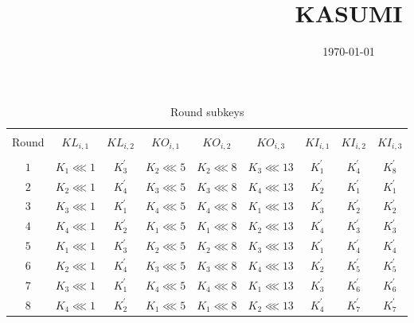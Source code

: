 \documentclass[12pt,a4paper]{article}
\title{KASUMI \vspace{-2em}}
\date{\today}
\begin{document}
  \maketitle
 \begin{table}[h!]
 	\centering
 	\begin{tabular}{|c c c c c c c c c|} 
 		\hline \\
 		Round & $KL_{i,1}$ & $KL_{i,2}$ & $KO_{i,1}$ & $KO_{i,2}$ & $KO_{i,3}$ & $KI_{i,1}$ & $KI_{i,2}$ & $KI_{i,3}$\\
 		\hline \\
 		$1$ & $K_1\lll 1$ & $K^{'}_3$ & $K_2 \lll 5$ & $K_2 \lll 8$& $K_3 \lll 13$& $K^{'}_1$& $K^{'}_4$ & $K^{'}_8$\\  [0.8ex]
 		
 		$2$ & $K_2\lll 1$ & $K^{'}_4$ & $K_3 \lll 5$ & $K_3 \lll 8$& $K_4 \lll 13$& $K^{'}_2$& $K^{'}_1$ & $K^{'}_1$\\  [0.8ex]
 		
 		$3$ & $K_3\lll 1$ & $K^{'}_1$ & $K_4 \lll 5$ & $K_4 \lll 8$& $K_1 \lll 13$& $K^{'}_3$& $K^{'}_2$ & $K^{'}_2$\\  [0.8ex]
 		
 		$4$ & $K_4\lll 1$ & $K^{'}_2$ & $K_1 \lll 5$ & $K_1 \lll 8$& $K_2 \lll 13$& $K^{'}_4$& $K^{'}_3$ & $K^{'}_3$\\  [0.8ex]
 		
 		$5$ & $K_1\lll 1$ & $K^{'}_3$ & $K_2 \lll 5$ & $K_2 \lll 8$& $K_3 \lll 13$& $K^{'}_1$& $K^{'}_4$ & $K^{'}_4$\\  [0.8ex]
 		
 		$6$ & $K_2\lll 1$ & $K^{'}_4$ & $K_3 \lll 5$ & $K_3 \lll 8$& $K_4 \lll 13$& $K^{'}_2$& $K^{'}_5$ & $K^{'}_5$\\  [0.8ex]
 		
 		$7$ & $K_3\lll 1$ & $K^{'}_1$ & $K_4 \lll 5$ & $K_4 \lll 8$& $K_1 \lll 13$& $K^{'}_3$& $K^{'}_6$ & $K^{'}_6$\\  [0.8ex]
 		
 		$8$ & $K_4\lll 1$ & $K^{'}_2$ & $K_1 \lll 5$ & $K_1 \lll 8$& $K_2 \lll 13$& $K^{'}_4$& $K^{'}_7$ & $K^{'}_7$ \\  [0.8ex]
 		\hline
 	\end{tabular}
 	\label{table:1}
 	\caption{Round subkeys}
 \end{table}
  
\end{document}
